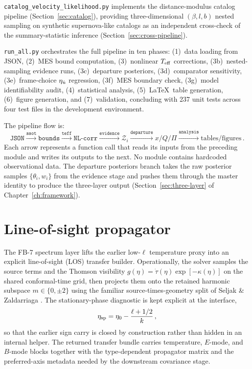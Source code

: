 \texttt{catalog\_velocity\_likelihood.py} implements the
distance-modulus catalog pipeline (Section~\ref{sec:catalog}),
providing three-dimensional $({\beta}, l, b)$ nested sampling
on synthetic supernova-like catalogs as an independent
cross-check of the summary-statistic inference
(Section~\ref{sec:cross-pipeline}).

\texttt{run\_all.py} orchestrates the full pipeline in ten
phases: (1)~data loading from JSON, (2)~MES bound computation,
(3)~nonlinear $T_{\mathrm{eff}}$ corrections, (3b)~nested-sampling evidence
runs, (3c)~departure posteriors, (3d)~comparator sensitivity,
(3e)~frame-choice $\eta_{\dot{u}}$ regression, (3f)~MES boundary check,
(3g)~model identifiability audit, (4)~statistical analysis,
(5)~\LaTeX\ table generation, (6)~figure generation, and
(7)~validation, concluding with 237 unit tests across four
test files in the development environment.

The pipeline flow is:
\begin{equation}\label{eq:pipeline}
\texttt{JSON} \xrightarrow{\texttt{ssot}}
\texttt{bounds} \xrightarrow{\texttt{teff}}
\texttt{NL-corr} \xrightarrow{\texttt{evidence}}
\mathcal{Z}_i \xrightarrow{\texttt{departure}}
x/Q/\Pi \xrightarrow{\texttt{analysis}}
\text{tables/figures}\,.
\end{equation}
Each arrow represents a function call that reads its inputs from
the preceding module and writes its outputs to the next.  No
module contains hardcoded observational data.  The departure
posteriors branch takes the raw posterior samples
$\{\theta_i, w_i\}$ from the evidence stage and pushes them
through the master identity to produce the three-layer output
(Section~\ref{sec:three-layer} of Chapter~\ref{ch:framework}).


\section{Line-of-sight propagator}
\label{sec:los-propagator}

The FB-7 spectrum layer lifts the earlier low-$\ell$ temperature
proxy into an explicit line-of-sight (LOS) transfer builder.
Operationally, the solver samples the source terms and the Thomson
visibility
$g(\eta) = \dot{\tau}(\eta)\exp[-\kappa(\eta)]$
on the shared conformal-time grid, then projects them onto the
retained harmonic subspace $m \in \{0,\pm2\}$ using the familiar
source-times-geometry split of Seljak \& Zaldarriaga
\cite{SeljakZaldarriaga1996}.  The stationary-phase diagnostic is
kept explicit at the interface,
\begin{equation}\label{eq:fb7-limber}
\eta_{\rm sp} = \eta_0 - \frac{\ell + 1/2}{k}\,,
\end{equation}
so that the earlier sign carry is closed by construction rather than
hidden in an internal helper.  The returned transfer bundle carries
temperature, $E$-mode, and $B$-mode blocks together with the
type-dependent propagator matrix and the preferred-axis metadata
needed by the downstream covariance stage.

